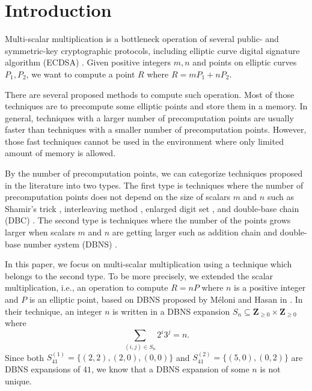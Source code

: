 \section{Introduction}

Multi-scalar multiplication is a bottleneck operation of several public- and symmetric-key cryptographic protocols,
including elliptic curve digital signature algorithm (ECDSA) \cite{ECDSA}.
Given positive integers $m, n$ and points on elliptic curves $P_1, P_2$,
we want to compute a point $R$ where
$R = m P_1 + n P_2.$

There are several proposed methods to compute such operation.
Most of those techniques are to precompute some elliptic points  and store them in a memory.
In general, techniques with a larger number of precomputation points are usually faster than techniques with a smaller number of precomputation points.
However, those fast techniques cannot be used in the environment where only limited amount of memory is allowed.

By the number of precomputation points, we can categorize techniques proposed in the literature into two types.
The first type is techniques where the number of precomputation points does not depend on the size of scalars $m$ and $n$ such as Shamir’s trick \cite{Shamir},
interleaving method \cite{interleaving}, enlarged digit set \cite{enlarged2,enlarged4,enlarged1,enlarged3}, and double-base chain (DBC) \cite{dbc2,dbc3,DKS09}.
The second type is techniques where the number of the points grows larger when scalars $m$ and $n$ are getting larger such as addition chain \cite{additionChain1,additionChain2}
and double-base number system (DBNS)  \cite{MH09}.

In this paper, we focus on multi-scalar multiplication using a technique which belongs to the second type.
To be more precisely, we extended the scalar multiplication, i.e., an operation to compute $R = nP$ where $n$ is a positive integer and $P$ is an elliptic point, 
based on DBNS proposed by M\'eloni and Hasan in \cite{MH09}.
In their technique, an integer $n$ is written in a DBNS expansion $S_n \subseteq \mathbf{Z}_{\geq 0} \times \mathbf{Z}_{\geq 0}$ where
$$\sum_{(i,j) \in S_n} 2^i 3^j = n.$$ 
Since both $S^{(1)}_{41} = \{(2,2), (2,0), (0,0)\}$ and $S^{(2)}_{41} = \{(5,0), (0,2)\}$ are DBNS expansions of $41$, we know that a DBNS expansion of some $n$ is not unique.

